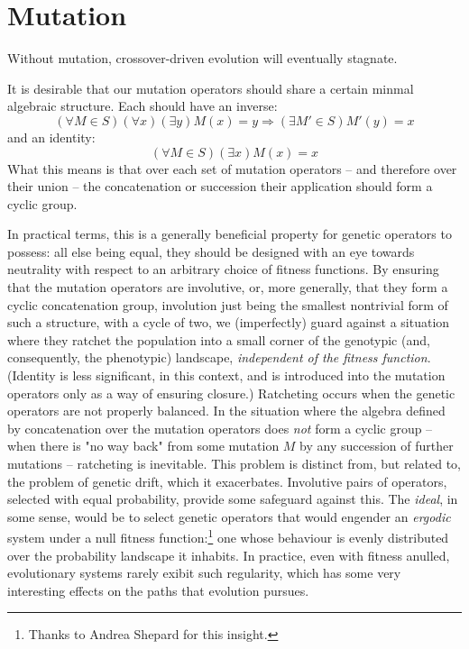 \documentclass[11pt]{article}
\begin{document}
\section{Mutation}
\label{sec:org5dca72c}

Without mutation, crossover-driven evolution will eventually stagnate. 

It is desirable that our mutation operators should share a certain minmal
algebraic structure. Each should have an inverse:
\[
(\forall M\in S)(\forall x)(\exists y) M(x) = y \Rightarrow 
(\exists M'\in S) M'(y) = x
\]
and an identity:
\[
(\forall M\in S)(\exists x) M(x) = x
\]
What this means is that over each set of mutation operators -- and
therefore over their union -- the concatenation or succession their
application should form a cyclic group.

In practical terms, this is a generally beneficial property for genetic
operators to possess: all else being equal, they should be designed with
an eye towards neutrality with respect to an arbitrary choice of fitness
functions. By ensuring that the mutation operators are involutive, or, more
generally, that they form a cyclic concatenation group, involution just being
the smallest nontrivial form of such a structure, with a cycle of two, we
(imperfectly) guard against a situation where they ratchet the population into a
small corner of the genotypic (and, consequently, the phenotypic) landscape,
\emph{independent of the fitness function}. (Identity is less significant, in this
context, and is introduced into the mutation operators only
as a way of ensuring closure.) Ratcheting occurs when the genetic
operators are not properly balanced. In the situation where the algebra defined
by concatenation over the mutation operators does \emph{not} form a cyclic group --
when there is "no way back" from some mutation \(M\) by any succession of further
mutations -- ratcheting is inevitable. This problem is distinct from, but
related to, the problem of genetic drift, which it exacerbates. Involutive pairs
of operators, selected with equal probability, provide some safeguard against
this. The \emph{ideal}, in some sense, would be to select genetic operators that
would engender an \emph{ergodic} system under a null fitness function:\footnote{Thanks to
 Andrea Shepard for this insight.} one whose behaviour is evenly distributed
over the probability landscape it inhabits. In practice, even with fitness
anulled, evolutionary systems rarely exibit such regularity, which has some very
interesting effects on the paths that evolution pursues.
\end{document}
